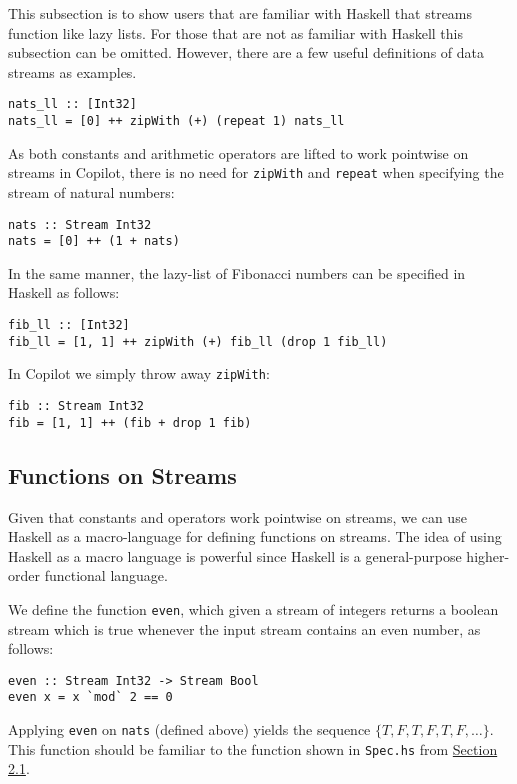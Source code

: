 This subsection is to show users that are familiar with Haskell that streams
function like lazy lists.
%
For those that are not as familiar with Haskell this
subsection can be omitted.
%
However, there are a few useful definitions of data
streams as examples.
%
\begin{lstlisting}[language = Copilot, frame = single]
nats_ll :: [Int32]
nats_ll = [0] ++ zipWith (+) (repeat 1) nats_ll
\end{lstlisting}
%
As both constants and arithmetic operators are lifted to work pointwise on
streams in Copilot, there is no need for {\tt zipWith} and {\tt repeat} when
specifying the stream of natural numbers:
%
\begin{lstlisting}[language = Copilot, frame = single]
nats :: Stream Int32
nats = [0] ++ (1 + nats)
\end{lstlisting}
%
In the same manner, the lazy-list of Fibonacci numbers can be specified  in Haskell as follows:
%
\begin{lstlisting}[language = Copilot, frame = single]
fib_ll :: [Int32]
fib_ll = [1, 1] ++ zipWith (+) fib_ll (drop 1 fib_ll)
\end{lstlisting}
%
In Copilot we simply throw away {\tt zipWith}:
\begin{lstlisting}[language = Copilot, frame = single]
fib :: Stream Int32
fib = [1, 1] ++ (fib + drop 1 fib)
\end{lstlisting}

\subsection{Functions on Streams} \label{sec:FnOnStreams}

Given that constants and operators work pointwise on streams, we can use
Haskell as a macro-language for defining functions on streams.
%
The idea of using Haskell as a macro language is powerful since Haskell is a
general-purpose higher-order functional language.

\begin{example}
We define the function {\tt even}, which given a stream of integers returns a
boolean stream which is true whenever the input stream contains an even number,
as follows:
%
\begin{lstlisting}[language = Copilot, frame = single]
even :: Stream Int32 -> Stream Bool
even x = x `mod` 2 == 0
\end{lstlisting}
%
Applying {\tt even} on {\tt nats} (defined above) yields the sequence
$\{T, F, T, F, T, F, \dots\}$.
%
This function should be familiar to the function shown in {\tt Spec.hs} from
\hyperref[interpcompile]{Section 2.1}.
\end{example}

